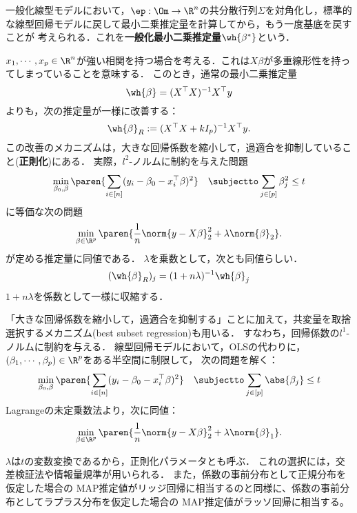\documentclass[uplatex,dvipdfmx]{jsreport}
\begin{document}
\begin{example}[GLS]
    一般化線型モデルにおいて，$\ep:\Om\to\R^n$の共分散行列$\Sigma$を対角化し，標準的な線型回帰モデルに戻して最小二乗推定量を計算してから，もう一度基底を戻すことが
    考えられる．これを\textbf{一般化最小二乗推定量}$\wh{\beta^*}$という．
\end{example}

\begin{example}[RIDGE正則化 (1970)]
    $x_1,\cdots,x_p\in\R^n$が強い相関を持つ場合を考える．これは$X\beta$が多重線形性を持ってしまっていることを意味する．
    このとき，通常の最小二乗推定量
    \[\wh{\beta}=(X^\top X)^{-1}X^\top y\]
    よりも，次の推定量が一様に改善する：
    \[\wh{\beta}_R:=(X^\top X+kI_p)^{-1}X^\top y.\]
    この改善のメカニズムは，大きな回帰係数を縮小して，過適合を抑制していること(\textbf{正則化})にある．
    実際，$l^2$-ノルムに制約を与えた問題
    \[\min_{\beta_0,\beta}\paren{\sum_{i\in[n]}(y_i-\beta_0-x_i^\top\beta)^2}\quad\subjectto\sum_{j\in[p]}\beta_j^2\le t\]
    に等価な次の問題
    \[\min_{\beta\in\R^p}\paren{\frac{1}{n}\norm{y-X\beta}^2_2+\lambda\norm{\beta}_2}.\]
    が定める推定量に同値である．
    $\lambda$を乗数として，次とも同値らしい．
    \[(\wh{\beta}_R)_j=(1+n\lambda)^{-1}\wh{\beta}_j\]
    $1+n\lambda$を係数として一様に収縮する．
\end{example}

\begin{example}
    「大きな回帰係数を縮小して，過適合を抑制する」ことに加えて，共変量を取捨選択するメカニズム(best subset regression)も用いる．
    すなわち，回帰係数の$l^1$-ノルムに制約を与える．
    線型回帰モデルにおいて，OLSの代わりに，$(\beta_1,\cdots,\beta_p)\in\R^p$をある半空間に制限して，
    次の問題を解く：
    \[\min_{\beta_0,\beta}\paren{\sum_{i\in[n]}(y_i-\beta_0-x_i^\top\beta)^2}\quad\subjectto\sum_{j\in[p]}\abs{\beta_j}\le t\]
    Lagrangeの未定乗数法より，次に同値：
    \[\min_{\beta\in\R^p}\paren{\frac{1}{n}\norm{y-X\beta}^2_2+\lambda\norm{\beta}_1}.\]
\end{example}
\begin{remarks}
    $\lambda$は$t$の変数変換であるから，正則化パラメータとも呼ぶ．
    これの選択には，交差検証法や情報量規準が用いられる．
    また，係数の事前分布として正規分布を仮定した場合の MAP推定値がリッジ回帰に相当するのと同様に、係数の事前分布としてラプラス分布を仮定した場合の MAP推定値がラッソ回帰に相当する。 
\end{remarks}
\end{document}
